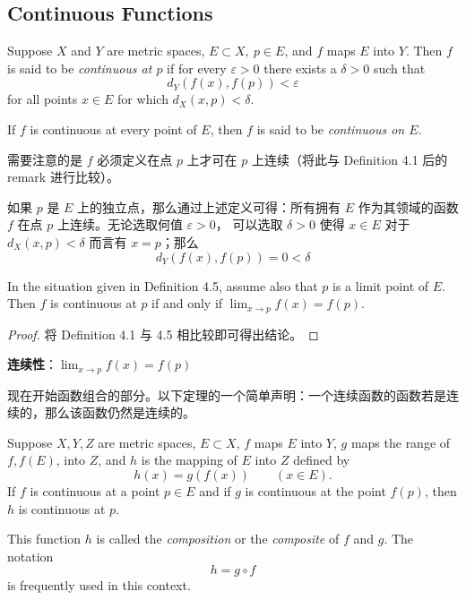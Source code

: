 \documentclass[../poma-notes.tex]{subfiles}
\begin{document}
\subsection*{Continuous Functions}

\begin{definition}
  Suppose $X$ and $Y$ are metric spaces, $E \subset X,\ p \in E$, and $f$ maps $E$ into $Y$. Then $f$ is said
  to be \textit{continuous at $p$} if for every $\varepsilon > 0$ there exists a $\delta > 0$ such that
  \[
    d_Y(f(x),f(p)) < \varepsilon
  \]
  for all points $x \in E$ for which $d_X(x,p) < \delta$.

  If $f$ is continuous at every point of $E$, then $f$ is said to be \textit{continuous on $E$}.
\end{definition}

需要注意的是 $f$ 必须定义在点 $p$ 上才可在 $p$ 上连续（将此与 Definition 4.1 后的 remark 进行比较）。

如果 $p$ 是 $E$ 上的独立点，那么通过上述定义可得：所有拥有 $E$ 作为其领域的函数 $f$ 在点 $p$ 上连续。无论选取何值 $\varepsilon>0$，
可以选取 $\delta > 0$ 使得 $x \in E$ 对于 $d_X(x,p) < \delta$ 而言有 $x = p$；那么
\[
  d_Y(f(x),f(p)) = 0 < \delta
\]

\begin{theorem}
  In the situation given in Definition 4.5, assume also that $p$ is a limit point of $E$. Then $f$ is continuous
  at $p$ if and only if $\lim_{x \to p} f(x) = f(p)$.
\end{theorem}

\begin{proof}
  将 Definition 4.1 与 4.5 相比较即可得出结论。
\end{proof}

\begin{anote}
  \textbf{连续性}：$\lim_{x \to p} f(x) = f(p)$
\end{anote}

现在开始函数组合的部分。以下定理的一个简单声明：一个连续函数的函数若是连续的，那么该函数仍然是连续的。

\begin{theorem}
  Suppose $X, Y, Z$ are metric spaces, $E \subset X$, $f$ maps $E$ into $Y$, $g$ maps the range of $f, f(E)$,
  into $Z$, and $h$ is the mapping of $E$ into $Z$ defined by
  \[
    h(x) = g(f(x)) \qquad (x \in E).
  \]
  If $f$ is continuous at a point $p \in E$ and if $g$ is continuous at the point $f(p)$, then $h$ is continuous
  at $p$.

  This function $h$ is called the \textit{composition} or the \textit{composite} of $f$ and $g$. The notation
  \[
    h = g \circ f
  \]
  is frequently used in this context.
\end{theorem}
\end{document}

